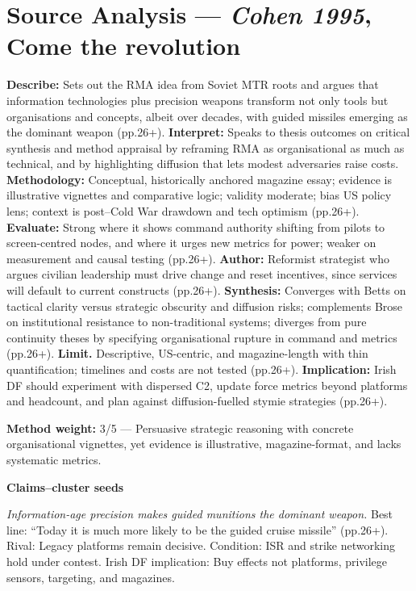 \section*{Source Analysis — \textit{Cohen 1995}, Come the revolution}
\textbf{Describe:} Sets out the RMA idea from Soviet MTR roots and argues that information technologies plus precision weapons transform not only tools but organisations and concepts, albeit over decades, with guided missiles emerging as the dominant weapon (pp.26+).
\textbf{Interpret:} Speaks to thesis outcomes on critical synthesis and method appraisal by reframing RMA as organisational as much as technical, and by highlighting diffusion that lets modest adversaries raise costs.
\textbf{Methodology:} Conceptual, historically anchored magazine essay; evidence is illustrative vignettes and comparative logic; validity moderate; bias US policy lens; context is post–Cold War drawdown and tech optimism (pp.26+).
\textbf{Evaluate:} Strong where it shows command authority shifting from pilots to screen-centred nodes, and where it urges new metrics for power; weaker on measurement and causal testing (pp.26+).
\textbf{Author:} Reformist strategist who argues civilian leadership must drive change and reset incentives, since services will default to current constructs (pp.26+).
\textbf{Synthesis:} Converges with Betts on tactical clarity versus strategic obscurity and diffusion risks; complements Brose on institutional resistance to non-traditional systems; diverges from pure continuity theses by specifying organisational rupture in command and metrics (pp.26+).
\textbf{Limit.} Descriptive, US-centric, and magazine-length with thin quantification; timelines and costs are not tested (pp.26+).
\textbf{Implication:} Irish DF should experiment with dispersed C2, update force metrics beyond platforms and headcount, and plan against diffusion-fuelled stymie strategies (pp.26+).

\textbf{Method weight:} 3/5 — Persuasive strategic reasoning with concrete organisational vignettes, yet evidence is illustrative, magazine-format, and lacks systematic metrics.

\textbf{Claims–cluster seeds}

\textit{Information-age precision makes guided munitions the dominant weapon.} Best line: “Today it is much more likely to be the guided cruise missile” (pp.26+). Rival: Legacy platforms remain decisive. Condition: ISR and strike networking hold under contest. Irish DF implication: Buy effects not platforms, privilege sensors, targeting, and magazines.

